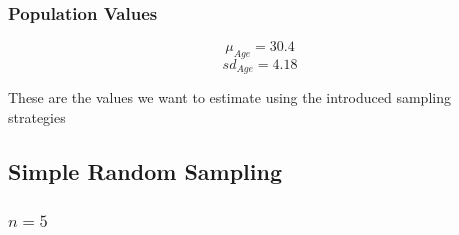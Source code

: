 \documentclass[
  a4paper,
]{scrbook}
\begin{document}
\subsubsection{Population Values}\label{population-values}

\[\mu_{Age} = 30.4\] \[sd_{Age} = 4.18\]

These are the values we want to estimate using the introduced sampling
strategies

\subsection{Simple Random Sampling}\label{simple-random-sampling}

\begin{table}

\caption{\label{tbl-srswor-overview}The means and standard deviations of
the classroom data for n = 5,10,15,20}


\end{table}%

\subsubsection{\texorpdfstring{\(n = 5\)}{n = 5}}\label{n-5}
\end{document}
